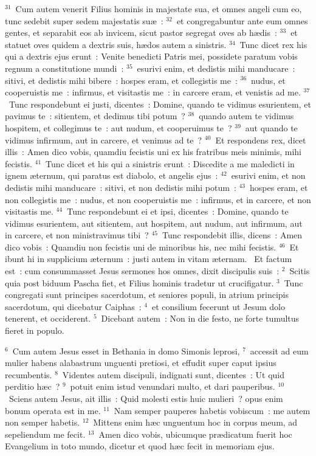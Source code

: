${}^{31}$~Cum autem venerit Filius hominis in majestate sua, et omnes angeli cum eo, tunc sedebit super sedem majestatis su\ae~:
${}^{32}$~et congregabuntur ante eum omnes gentes, et separabit eos ab invicem, sicut pastor segregat oves ab h\ae dis~:
${}^{33}$~et statuet oves quidem a dextris suis, h\ae dos autem a sinistris.
${}^{34}$~Tunc dicet rex his qui a dextris ejus erunt~: Venite benedicti Patris mei, possidete paratum vobis regnum a constitutione mundi~:
${}^{35}$~esurivi enim, et dedistis mihi manducare~: sitivi, et dedistis mihi bibere~: hospes eram, et collegistis me~:
${}^{36}$~nudus, et cooperuistis me~: infirmus, et visitastis me~: in carcere eram, et venistis ad me.
${}^{37}$~Tunc respondebunt ei justi, dicentes~: Domine, quando te vidimus esurientem, et pavimus te~: sitientem, et dedimus tibi potum~?
${}^{38}$~quando autem te vidimus hospitem, et collegimus te~: aut nudum, et cooperuimus te~?
${}^{39}$~aut quando te vidimus infirmum, aut in carcere, et venimus ad te~?
${}^{40}$~Et respondens rex, dicet illis~: Amen dico vobis, quamdiu fecistis uni ex his fratribus meis minimis, mihi fecistis.
${}^{41}$~Tunc dicet et his qui a sinistris erunt~: Discedite a me maledicti in ignem \ae ternum, qui paratus est diabolo, et angelis ejus~:
${}^{42}$~esurivi enim, et non dedistis mihi manducare~: sitivi, et non dedistis mihi potum~:
${}^{43}$~hospes eram, et non collegistis me~: nudus, et non cooperuistis me~: infirmus, et in carcere, et non visitastis me.
${}^{44}$~Tunc respondebunt ei et ipsi, dicentes~: Domine, quando te vidimus esurientem, aut sitientem, aut hospitem, aut nudum, aut infirmum, aut in carcere, et non ministravimus tibi~?
${}^{45}$~Tunc respondebit illis, dicens~: Amen dico vobis~: Quamdiu non fecistis uni de minoribus his, nec mihi fecistis.
${}^{46}$~Et ibunt hi in supplicium \ae ternum~: justi autem in vitam \ae ternam.
~Et factum est~: cum consummasset Jesus sermones hos omnes, dixit discipulis suis~:
${}^{2}$~Scitis quia post biduum Pascha fiet, et Filius hominis tradetur ut crucifigatur.
${}^{3}$~Tunc congregati sunt principes sacerdotum, et seniores populi, in atrium principis sacerdotum, qui dicebatur Caiphas~:
${}^{4}$~et consilium fecerunt ut Jesum dolo tenerent, et occiderent.
${}^{5}$~Dicebant autem~: Non in die festo, ne forte tumultus fieret in populo.


${}^{6}$~Cum autem Jesus esset in Bethania in domo Simonis leprosi,
${}^{7}$~accessit ad eum mulier habens alabastrum unguenti pretiosi, et effudit super caput ipsius recumbentis.
${}^{8}$~Videntes autem discipuli, indignati sunt, dicentes~: Ut quid perditio h\ae c~?
${}^{9}$~potuit enim istud venundari multo, et dari pauperibus.
${}^{10}$~Sciens autem Jesus, ait illis~: Quid molesti estis huic mulieri~? opus enim bonum operata est in me.
${}^{11}$~Nam semper pauperes habetis vobiscum~: me autem non semper habetis.
${}^{12}$~Mittens enim h\ae c unguentum hoc in corpus meum, ad sepeliendum me fecit.
${}^{13}$~Amen dico vobis, ubicumque pr\ae dicatum fuerit hoc Evangelium in toto mundo, dicetur et quod h\ae c fecit in memoriam ejus.


